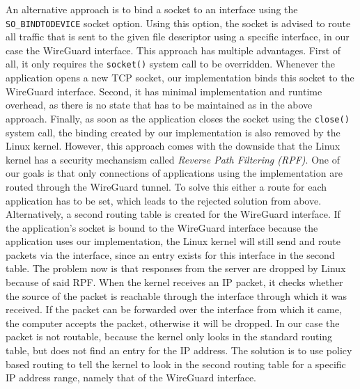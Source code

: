 An alternative approach is to bind a socket to an interface using the \texttt{SO\_BINDTODEVICE} socket option.
Using this option, the socket is advised to route all traffic that is sent to the given file descriptor using a specific interface, in our case the WireGuard interface.
This approach has multiple advantages.
First of all, it only requires the \texttt{socket()} system call to be overridden.
Whenever the application opens a new TCP socket, our \ld implementation binds this socket to the WireGuard interface.
Second, it has minimal implementation and runtime overhead, as there is no state that has to be maintained as in the above approach.
Finally, as soon as the application closes the socket using the \texttt{close()} system call, the binding created by our \ld implementation is also removed by the Linux kernel.
However, this approach comes with the downside that the Linux kernel has a security mechansism called \textit{Reverse Path Filtering (RPF)}.
One of our goals is that only connections of applications using the \ld implementation are routed through the WireGuard tunnel.
To solve this either a route for each application has to be set, which leads to the rejected solution from above.
Alternatively, a second routing table is created for the WireGuard interface.
If the application's socket is bound to the WireGuard interface because the application uses our \ld implementation, the Linux kernel will still send and route packets via the interface, since an entry exists for this interface in the second table.
The problem now is that responses from the server are dropped by Linux because of said RPF.
When the kernel receives an IP packet, it checks whether the source of the packet is reachable through the interface through which it was received.
If the packet can be forwarded over the interface from which it came, the computer accepts the packet, otherwise it will be dropped.
In our case the packet is not routable, because the kernel only looks in the standard routing table, but does not find an entry for the IP address.
The solution is to use policy based routing to tell the kernel to look in the second routing table for a specific IP address range, namely that of the WireGuard interface.
